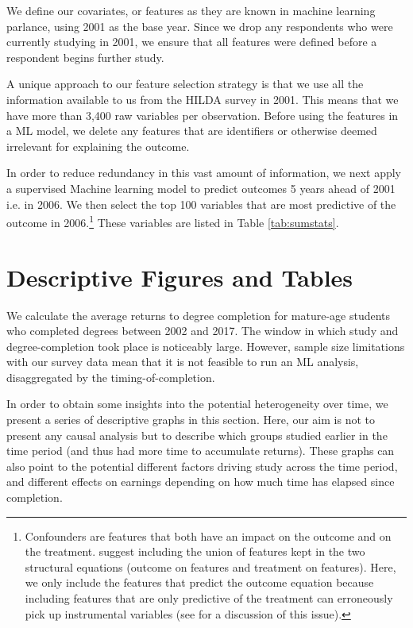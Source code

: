 \documentclass[12pt, a4paper]{article}
\begin{document}
We define our covariates, or features as they are known in machine learning
parlance, using 2001 as the base year. Since we drop any respondents who were
currently studying in 2001, we ensure that all features were defined before a
respondent begins further study.%

A unique approach to our feature selection strategy is that we use all the
information available to us from the HILDA survey in 2001. This means that we
have more than 3,400 raw variables per observation. Before using the features
in a ML model, we delete any features that are identifiers or otherwise deemed
irrelevant for explaining the outcome.

In order to reduce redundancy in this vast amount of information, we next apply a supervised Machine learning model to predict outcomes 5 years ahead of 2001 i.e. in 2006. We then select the top 100 variables that are most predictive of the outcome in 2006.\footnote{Confounders are features that both have an impact on the outcome and on the treatment. \cite{cherno2018} suggest including the union of features kept in the two structural equations (outcome on features and treatment on features). Here, we only include the features that predict the outcome equation because including features that are only predictive of the treatment can erroneously pick up instrumental variables (see \cite{pearl2012class} for a discussion of this issue). } These variables are listed in Table \ref{tab:sumstats}. 


\section{Descriptive Figures and Tables}

We calculate the average returns to degree completion for mature-age students who completed degrees between 2002 and 2017. The window in which study and degree-completion took place is noticeably large. However, sample size limitations with our survey data mean that it is not feasible to run an ML analysis, disaggregated by the timing-of-completion.

In order to obtain some insights into the potential heterogeneity over time, we present a series of descriptive graphs in this section. Here, our aim is not to present any causal analysis but to describe which groups studied earlier in the time period (and thus had more time to accumulate returns). These graphs can also point to the potential different factors driving study across the time period, and different effects on earnings depending on how much time has elapsed since completion. 
\end{document}
